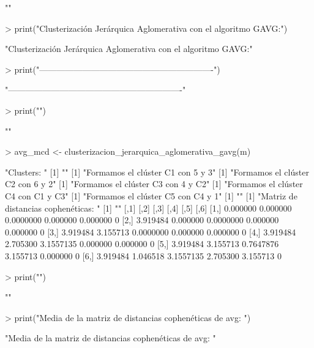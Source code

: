 \documentclass[parskip=full]{scrartcl}
\begin{document}
\begin{Schunk}
\begin{Soutput}
[1] ""
\end{Soutput}
\begin{Sinput}
> print("Clusterización Jerárquica Aglomerativa con el algoritmo GAVG:")
\end{Sinput}
\begin{Soutput}
[1] "Clusterización Jerárquica Aglomerativa con el algoritmo GAVG:"
\end{Soutput}
\begin{Sinput}
> print("-------------------------------------------------------------")
\end{Sinput}
\begin{Soutput}
[1] "-------------------------------------------------------------"
\end{Soutput}
\begin{Sinput}
> print("")
\end{Sinput}
\begin{Soutput}
[1] ""
\end{Soutput}
\begin{Sinput}
> avg_mcd <- clusterizacion_jerarquica_aglomerativa_gavg(m)
\end{Sinput}
\begin{Soutput}
[1] "Clusters: "
[1] ""
[1] "Formamos el clúster C1 con 5 y 3"
[1] "Formamos el clúster C2 con 6 y 2"
[1] "Formamos el clúster C3 con 4 y C2"
[1] "Formamos el clúster C4 con C1 y C3"
[1] "Formamos el clúster C5 con C4 y 1"
[1] ""
[1] "Matriz de distancias cophenéticas: "
[1] ""
         [,1]     [,2]      [,3]     [,4]     [,5] [,6]
[1,] 0.000000 0.000000 0.0000000 0.000000 0.000000    0
[2,] 3.919484 0.000000 0.0000000 0.000000 0.000000    0
[3,] 3.919484 3.155713 0.0000000 0.000000 0.000000    0
[4,] 3.919484 2.705300 3.1557135 0.000000 0.000000    0
[5,] 3.919484 3.155713 0.7647876 3.155713 0.000000    0
[6,] 3.919484 1.046518 3.1557135 2.705300 3.155713    0
\end{Soutput}
\begin{Sinput}
> print("")
\end{Sinput}
\begin{Soutput}
[1] ""
\end{Soutput}
\begin{Sinput}
> print("Media de la matriz de distancias cophenéticas de avg: ")
\end{Sinput}
\begin{Soutput}
[1] "Media de la matriz de distancias cophenéticas de avg: "
\end{Soutput}
\begin{Sinput}

\end{Sinput}
\end{Schunk}
\end{document}
